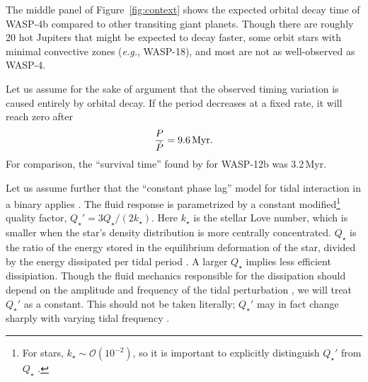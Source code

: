 \documentclass[12pt,twocolumn,tighten]{aastex62}
\begin{document}
The middle panel of Figure~\ref{fig:context} shows the expected
orbital decay time of WASP-4b compared to other transiting giant
planets.  Though there are roughly 20 hot Jupiters that might be
expected to decay faster, some orbit stars with minimal convective
zones ({\it e.g.}, WASP-18), and most are not as well-observed as
WASP-4.

Let us assume for the sake of argument that the observed timing
variation is caused entirely by orbital decay.  If the period
decreases at a fixed rate, it will reach zero after
\begin{equation}
  \frac{P}{ \dot{P} } = 9.6 \, {\rm Myr}.
\end{equation}
For comparison, the ``survival time'' found by \citet{patra_2017} for
WASP-12b was 3.2\,Myr.

Let us assume further that the ``constant phase lag'' model for tidal
interaction in a binary applies \citep{zahn_tidal_1977}.  The fluid
response is parametrized by a constant modified\footnote{For stars,
$k_\star \sim \mathcal{O}(10^{-2})$, so it is important to explicitly
distinguish $Q_\star'$ from $Q_\star$ \citep[{\it
e.g.},][]{schwarzschild_structure_1958}.} quality factor, $Q_\star' =
3 Q_\star / (2k_\star)$.  Here $k_\star$ is the stellar Love number,
which is smaller when the star's density distribution is more
centrally concentrated. $Q_\star$ is the ratio of the energy stored in
the equilibrium deformation of the star, divided by the energy
dissipated per tidal period \citep[{\it e.g.},][]{goldreich_q_1966}.
A larger $Q_\star$ implies less efficient dissipiation.  Though the
fluid mechanics responsible for the dissipation should depend on the
amplitude and frequency of the tidal perturbation
\citep[][Section~3.3]{ogilvie_tidal_2014}, we will treat $Q_\star'$ as
a constant.  This should not be taken literally; $Q_\star'$ may in
fact change sharply with varying tidal frequency
\citep{penev_empirical_2018}.
\end{document}
